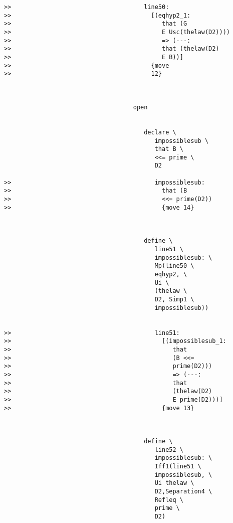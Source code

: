 \documentclass[12pt]{article}
\begin{document}
\begin{verbatim}
>>                                     line50:
>>                                       [(eqhyp2_1:
>>                                          that (G
>>                                          E Usc(thelaw(D2))))
>>                                          => (---:
>>                                          that (thelaw(D2)
>>                                          E B))]
>>                                       {move
>>                                       12}



                                    open


                                       declare \
                                          impossiblesub \
                                          that B \
                                          <<= prime \
                                          D2

>>                                        impossiblesub:
>>                                          that (B
>>                                          <<= prime(D2))
>>                                          {move 14}



                                       define \
                                          line51 \
                                          impossiblesub: \
                                          Mp(line50 \
                                          eqhyp2, \
                                          Ui \
                                          (thelaw \
                                          D2, Simp1 \
                                          impossiblesub))


>>                                        line51:
>>                                          [(impossiblesub_1:
>>                                             that
>>                                             (B <<=
>>                                             prime(D2)))
>>                                             => (---:
>>                                             that
>>                                             (thelaw(D2)
>>                                             E prime(D2)))]
>>                                          {move 13}



                                       define \
                                          line52 \
                                          impossiblesub: \
                                          Iff1(line51 \
                                          impossiblesub, \
                                          Ui thelaw \
                                          D2,Separation4 \
                                          Refleq \
                                          prime \
                                          D2)


\end{verbatim}
\end{document}
